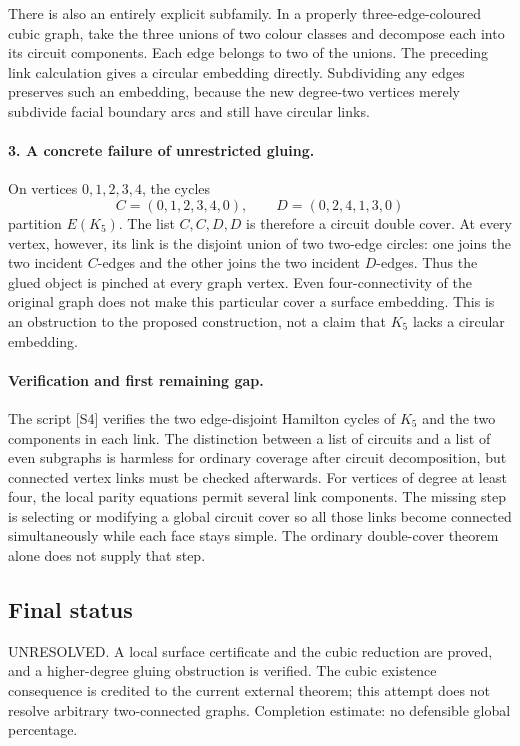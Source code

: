 \documentclass[11pt,a4paper]{article}
\begin{document}
There is also an entirely explicit subfamily. In a properly
three-edge-coloured cubic graph, take the three unions of two colour
classes and decompose each into its circuit components. Each edge
belongs to two of the unions. The preceding link calculation gives a
circular embedding directly. Subdividing any edges preserves such an
embedding, because the new degree-two vertices merely subdivide facial
boundary arcs and still have circular links.

\paragraph{3. A concrete failure of unrestricted gluing.}
On vertices $0,1,2,3,4$, the cycles
\[
 C=(0,1,2,3,4,0),\qquad D=(0,2,4,1,3,0)
\]
partition $E(K_5)$. The list $C,C,D,D$ is therefore a circuit double
cover. At every vertex, however, its link is the disjoint union of
two two-edge circles: one joins the two incident $C$-edges and the
other joins the two incident $D$-edges. Thus the glued object is
pinched at every graph vertex. Even four-connectivity of the original
graph does not make this particular cover a surface embedding.
This is an obstruction to the proposed construction, not a claim that
$K_5$ lacks a circular embedding.

\paragraph{Verification and first remaining gap.}
The script [S4] verifies the two edge-disjoint Hamilton cycles of $K_5$
and the two components in each link. The distinction between a list
of circuits and a list of even subgraphs is harmless for ordinary
coverage after circuit decomposition, but connected vertex links must
be checked afterwards. For vertices of degree at least four, the
local parity equations permit several link components. The missing
step is selecting or modifying a global circuit cover so all those
links become connected simultaneously while each face stays simple.
The ordinary double-cover theorem alone does not supply that step.

\subsection{Final status}
UNRESOLVED. A local surface certificate and the cubic reduction are
proved, and a higher-degree gluing obstruction is verified. The cubic
existence consequence is credited to the current external theorem;
this attempt does not resolve arbitrary two-connected graphs.
Completion estimate: no defensible global percentage.
\end{document}
